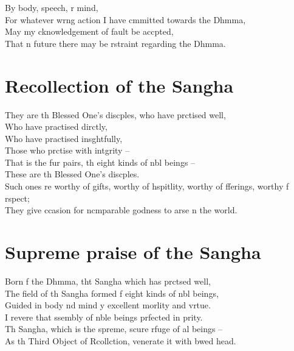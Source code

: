 \clearpage


By body, speech, r mind,\\
For whatever wrng action I have cmmitted towards the Dhmma,\\
May my cknowledgement of fault be accpted,\\
That n future there may be rstraint regarding the Dhmma.

\chapter{Recollection of the Sangha}%

\begin{leader}
\end{leader}

They are th Blessed One's discples, who have prctised well,\\
Who have practised dirctly,\\
Who have practised insghtfully,\\
Those who prctise with intgrity --\\
That is the fur pairs, th eight kinds of nbl beings --\\
These are th Blessed One's discples.\\
Such ones re worthy of gifts, worthy of hspitlity, worthy of fferings, worthy f rspect;\\
They give ccasion for ncmparable godness to arse n the world.

\chapter{Supreme praise of the Sangha}%

\begin{leader}
\end{leader}

Born f the Dhmma, tht Sangha which has prctsed well,\\
The field of th Sangha formed f eight kinds of nbl beings,\\
Guided in body nd mind y excellent morlity and vrtue.\\
I revere that ssembly of nble beings prfected in prity.\\
Th Sangha, which is the spreme, scure rfuge of al beings --\\
As th Third Object of Rcollction,  venerate it with bwed head.

